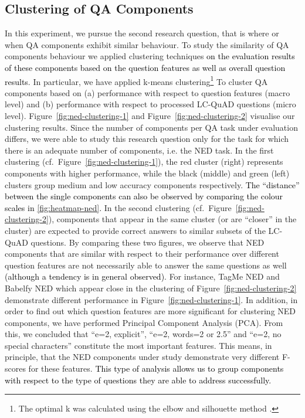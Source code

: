 \documentclass[sigconf,edbt]{acmart-edbt2019}
\newcommand{\jlt}[1]{\todo[inline, color=cyan]{JL: #1}}
\begin{document}
\subsection{Clustering of QA Components} \label{sec:clustering}
In this experiment, we pursue the second research question, that is where or when QA components exhibit similar behaviour. To study the similarity of QA components behaviour we applied clustering techniques \textcolor{black}{on the evaluation results of these components based on the question features as well as overall question results}. In particular, we have applied k-means clustering\footnote{The optimal k was calculated using the elbow and silhouette method \cite{Rousseeuw:1987:SGA:38768.38772}.} 
To cluster QA components based on (a) performance with respect to question features (macro level) and (b) performance with respect to processed LC-QuAD questions (micro level).
Figure~\ref{fig:ned-clustering-1} and Figure~\ref{fig:ned-clustering-2} visualise our clustering results. Since the number of components per QA task under evaluation differs, we were able to study this research question only for the task for which there is an adequate number of components, i.e. the NED task.
In the first clustering (cf.\ Figure~\ref{fig:ned-clustering-1}), the red cluster (right) represents components with higher performance, while the black (middle) and green (left) clusters group medium and low accuracy components respectively. \textcolor{black}{The ``distance'' between the single components can also be observed by comparing the colour scales in \autoref{fig:heatmap-ned}.} In the second clustering (cf.\ Figure~\ref{fig:ned-clustering-2}), components that appear in the same cluster (or are ``closer'' in the cluster) are expected to provide correct answers to similar subsets of the LC-QuAD questions. 
By comparing these two figures, we observe that NED components that are similar with respect to their performance over different question features are not necessarily able to answer the same questions as well \textcolor{black}{(although a tendency is in general observed)}. For instance, TagMe NED and Babelfy NED \cite{DBLP:journals/tacl/0001RN14} which appear close in the clustering of Figure~\ref{fig:ned-clustering-2} demonstrate different performance in Figure~\ref{fig:ned-clustering-1}. In addition, in order to find out which question features are more significant for clustering NED components, we have performed Principal Component Analysis (PCA). From this, we concluded that ``e=2, explicit'', ``e=2, words=2 or 2.5'' and ``e=2, no special characters'' constitute the most important features. This means, in principle, that the NED components under study demonstrate very different F-scores for these features. \textcolor{black}{This type of analysis allows us to group components with respect to the type of questions they are able to address successfully.}
\end{document}
